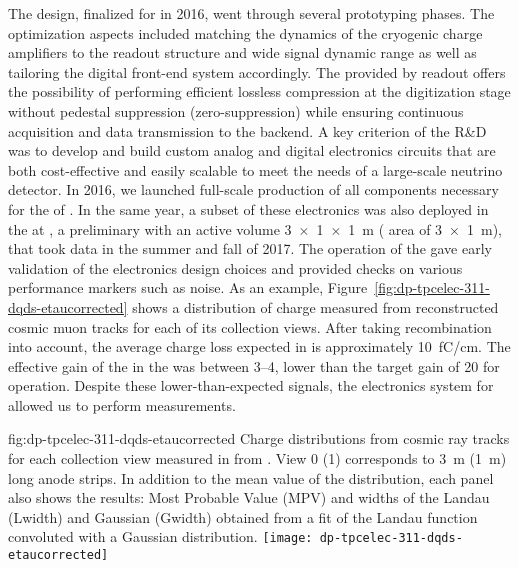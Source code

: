 The design, finalized for  in 2016, went through several prototyping phases. The optimization aspects included matching the dynamics of the cryogenic charge amplifiers to the  readout structure and wide signal dynamic range as well as tailoring the digital front-end system accordingly. The  provided by  readout offers the possibility of performing efficient lossless compression at the digitization stage without pedestal suppression (zero-suppression) while ensuring continuous acquisition and data transmission to the  backend. A key criterion of the R\&D was to develop and build custom analog and digital electronics circuits that are both cost-effective and easily scalable to meet the needs of a large-scale neutrino  detector. In 2016, we launched full-scale production of all components necessary for the  of . In the same year, a subset of these electronics was also deployed in the  at , a preliminary   with an active volume \SI[product-units=power]{3x1x1}{m} ( area of \SI[product-units=power]{3x1}{m}), that took data in the summer and fall of 2017. The operation of the  \cite{Aimard:2018yxp} gave early validation of the electronics  design choices and provided checks on various performance markers such as noise. As an example, Figure~\ref{fig:dp-tpcelec-311-dqds-etaucorrected} shows a distribution of charge measured from reconstructed cosmic muon tracks for each of its collection views. After taking recombination into account, the average  charge loss expected in  is approximately \SI{10}{\femto\coulomb/\cm}. The effective gain of the  in the  was between \numrange{3}{4}, lower than the target gain of \num{20} for  operation. Despite these lower-than-expected signals, the electronics system for  allowed us to perform measurements. 

\begin{dunefigure}{fig:dp-tpcelec-311-dqds-etaucorrected}
{Charge distributions from cosmic ray tracks for each collection view measured in   from \cite{Aimard:2018yxp}. View \num{0} (\num{1}) corresponds to \SI{3}{\meter} (\SI{1}{\meter}) long anode strips. In addition to the mean value of the distribution, each panel also shows the results: Most Probable Value (MPV) and widths of the Landau (Lwidth) and Gaussian (Gwidth) obtained from a fit of the Landau function convoluted with a Gaussian distribution.}
\texttt{[image: dp-tpcelec-311-dqds-etaucorrected]}
\end{dunefigure}

